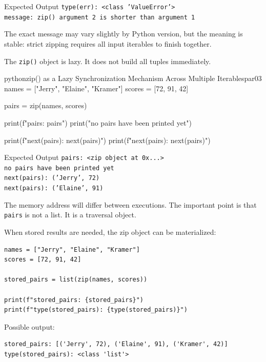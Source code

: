 \begin{iobox}{Expected Output}
\texttt{type(err): <class 'ValueError'>} \\
\texttt{message: zip() argument 2 is shorter than argument 1} \\
\end{iobox}


The exact message may vary slightly by Python version, but the meaning is stable: strict zipping requires all input iterables to finish together.

The \texttt{zip()} object is lazy. It does not build all tuples immediately.

\begin{codebox}[]{python}{zip() as a Lazy Synchronization Mechanism Across Multiple Iterables}{par03}
names = ["Jerry", "Elaine", "Kramer"]
scores = [72, 91, 42]

pairs = zip(names, scores)

print(f"pairs: {pairs}")
print("no pairs have been printed yet")

print(f"next(pairs): {next(pairs)}")
print(f"next(pairs): {next(pairs)}")
\end{codebox}


\begin{iobox}{Expected Output}
\texttt{pairs: <zip object at 0x...>} \\
\texttt{no pairs have been printed yet} \\
\texttt{next(pairs): ('Jerry', 72)} \\
\texttt{next(pairs): ('Elaine', 91)} \\
\end{iobox}


The memory address will differ between executions. The important point is that \texttt{pairs} is not a list. It is a traversal object.

When stored results are needed, the zip object can be materialized:

\begin{verbatim}
names = ["Jerry", "Elaine", "Kramer"]
scores = [72, 91, 42]

stored_pairs = list(zip(names, scores))

print(f"stored_pairs: {stored_pairs}")
print(f"type(stored_pairs): {type(stored_pairs)}")
\end{verbatim}

Possible output:

\begin{verbatim}
stored_pairs: [('Jerry', 72), ('Elaine', 91), ('Kramer', 42)]
type(stored_pairs): <class 'list'>
\end{verbatim}

